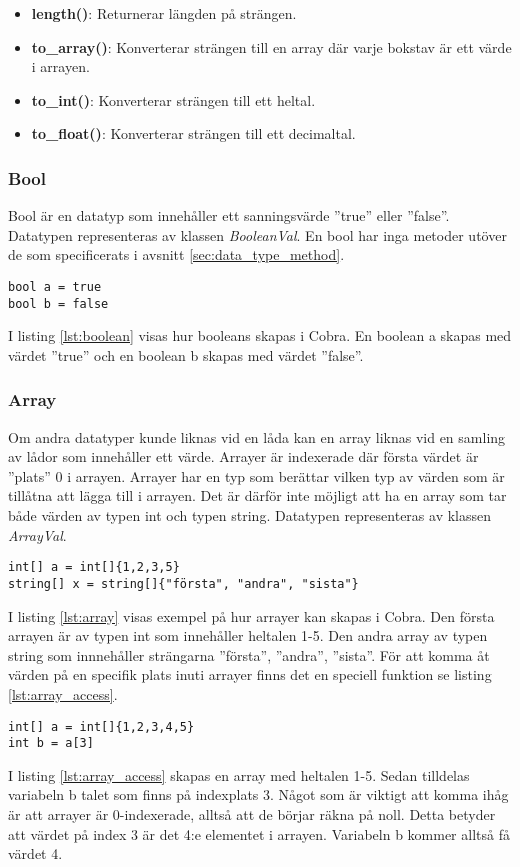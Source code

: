 \documentclass{TDP003mall}
\begin{document}
\begin{itemize}
    \item \textbf{length()}: Returnerar längden på strängen.
    \item \textbf{to\_array()}: Konverterar strängen till en array där varje bokstav är ett värde i arrayen.
    \item \textbf{to\_int()}: Konverterar strängen till ett heltal.
    \item \textbf{to\_float()}: Konverterar strängen till ett decimaltal.
\end{itemize}

\subsubsection{Bool}
Bool är en datatyp som innehåller ett sanningsvärde ''true'' eller ''false''. 
Datatypen representeras av klassen \emph{BooleanVal}. En bool har inga metoder utöver de som specificerats i avsnitt \ref{sec:data_type_method}.

\begin{lstlisting}[caption=Boolean-exempel, label=lst:boolean]
bool a = true
bool b = false
\end{lstlisting}
I listing \ref{lst:boolean} visas hur booleans skapas i Cobra. En boolean a skapas med värdet ''true'' och en boolean b skapas med värdet ''false''.

\subsubsection{Array}
Om andra datatyper kunde liknas vid en låda kan en array liknas vid en samling av lådor som innehåller ett värde. 
Arrayer är indexerade där första värdet är ''plats'' 0 i arrayen. 
Arrayer har en typ som berättar vilken typ av värden som är tillåtna att lägga till i arrayen. Det är därför inte möjligt att ha en array som tar både värden av typen int och typen string.
Datatypen representeras av klassen \emph{ArrayVal}.

\begin{lstlisting}[caption=Array-exempel, label=lst:array]
int[] a = int[]{1,2,3,5}
string[] x = string[]{"första", "andra", "sista"}
\end{lstlisting}
I listing \ref{lst:array} visas exempel på hur arrayer kan skapas i Cobra. Den första arrayen är av typen int som innehåller heltalen 1-5. Den andra array av typen string som innnehåller strängarna ''första'', ''andra'', ''sista''.
\newpage
För att komma åt värden på en specifik plats inuti arrayer finns det en speciell funktion se listing \ref{lst:array_access}.
\begin{lstlisting}[caption=Åtkomst till värden i en array, label=lst:array_access]
int[] a = int[]{1,2,3,4,5}
int b = a[3]
\end{lstlisting}
I listing \ref{lst:array_access} skapas en array med heltalen 1-5.
Sedan tilldelas variabeln b talet som finns på indexplats 3. Något som är viktigt att komma ihåg är att arrayer är 0-indexerade, alltså att de börjar räkna på noll. Detta betyder att värdet på index 3 är det 4:e elementet i arrayen.
Variabeln b kommer alltså få värdet 4.
\end{document}
